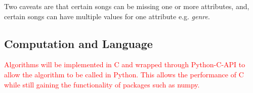 \documentclass[a4paper,11pt]{article}
\begin{document}
Two caveats are that certain songs can be missing one or more attributes, and, certain songs can have multiple values for one attribute e.g. \textit{genre}.


\subsection{Computation and Language}

\textcolor{red}{Algorithms will be implemented in C and wrapped through Python-C-API to allow the algorithm to be called in Python. This allows the performance of C while still gaining the functionality of packages such as numpy.
}

\end{document}
